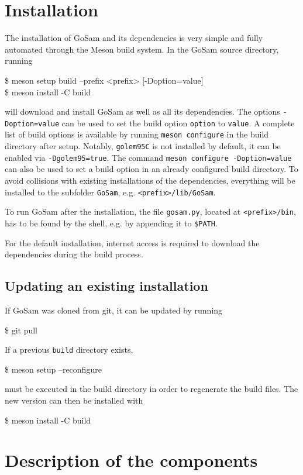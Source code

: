 \documentclass[11pt,a4paper]{refrep}
\newcommand{\gosam}{{\sc GoSam}\xspace}
\newcommand{\golemVC}{{\tt golem95C}\xspace}
\begin{document}
\section{Installation}

The installation of GoSam and its dependencies is very simple and fully automated through the Meson
build system. In the GoSam source directory, running 
\begin{example}
\$ meson setup build --prefix <prefix> [-Doption=value] \\
\$ meson install -C build
\end{example}
will download and install GoSam as well as all its dependencies. The options {\tt -Doption=value} can
be used to set the build option {\tt option} to {\tt value}. A complete list of build options is available by
running {\tt meson configure} in the build directory after
setup. Notably, \golemVC is not installed by default, it can be
enabled via \texttt{-Dgolem95=true}. The command {\tt meson configure -Doption=value} can also
be used to set a build option in an already configured build directory. To avoid collisions with existing
installations of the dependencies, everything will be installed to the subfolder {\tt GoSam},
e.g. {\tt <prefix>/lib/GoSam}.

To run \gosam after the installation, the file \texttt{gosam.py}, located at \texttt{<prefix>/bin}, has to be found by the shell, e.g. by appending it to \texttt{\$PATH}.

For the default installation, internet access is required to download the dependencies during the build process.

\subsection{Updating an existing installation}

If GoSam was cloned from git, it can be updated by running
\begin{example}
\$ git pull
\end{example}
If a previous \texttt{build} directory exists, 
\begin{example}
\$ meson setup --reconfigure
\end{example}
must be executed in the build directory in order to regenerate the build files. The new version can then be installed with 
\begin{example}
\$ meson install -C build
\end{example}


\section{Description of the components}
\end{document}
